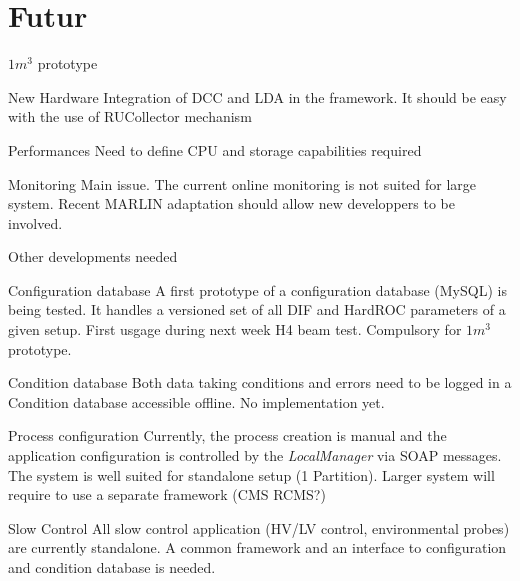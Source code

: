 \section{Futur}



\begin{frame}{$ 1 m^3 $ prototype }

  \begin{block}{New Hardware}
    Integration of DCC and LDA in the framework. It should be easy with the use of RUCollector mechanism
  \end{block}
  \begin{block}{Performances}
    Need to define CPU and storage capabilities required
  \end{block}
  \begin{alertblock}{Monitoring}
    Main issue. The current online monitoring is not suited for large system. Recent MARLIN adaptation should allow new developpers to be involved.
  \end{alertblock}


\end{frame}

\begin{frame}[shrink=15]{ Other developments needed}

  \begin{block}{Configuration database}
    A first prototype of a configuration database (MySQL) is being tested. It handles  a versioned set of all DIF and HardROC parameters of a given setup. First usgage during next week H4 beam test. Compulsory for $1 m^3$ prototype.
  \end{block}
  \pause \begin{block}{Condition database}
    Both data taking conditions and errors need to be logged in a Condition database accessible offline. No implementation yet.
  \end{block}

  \pause \begin{block}{Process configuration}
    Currently, the process creation is manual and the application configuration is controlled by the {\sl LocalManager} via SOAP messages. The system is well suited for standalone setup (1 Partition). Larger system will require to use a separate framework (CMS RCMS?) 
  \end{block}

  \pause \begin{block}{Slow Control}
    All slow control application (HV/LV control, environmental probes) are currently standalone. A common framework and an interface to configuration and condition database is needed.
  \end{block}

\end{frame}

